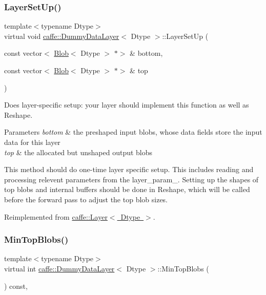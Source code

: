 \subsubsection{\texorpdfstring{Layer\+Set\+Up()}{LayerSetUp()}\hspace{0.1cm}{\footnotesize\ttfamily [2/2]}}
{\footnotesize\ttfamily template$<$typename Dtype$>$ \\
virtual void \mbox{\hyperlink{classcaffe_1_1_dummy_data_layer}{caffe\+::\+Dummy\+Data\+Layer}}$<$ Dtype $>$\+::Layer\+Set\+Up (\begin{DoxyParamCaption}\item[{const vector$<$ \mbox{\hyperlink{classcaffe_1_1_blob}{Blob}}$<$ Dtype $>$ $\ast$$>$ \&}]{bottom,  }\item[{const vector$<$ \mbox{\hyperlink{classcaffe_1_1_blob}{Blob}}$<$ Dtype $>$ $\ast$$>$ \&}]{top }\end{DoxyParamCaption})\hspace{0.3cm}{\ttfamily [virtual]}}



Does layer-\/specific setup\+: your layer should implement this function as well as Reshape. 


\begin{DoxyParams}{Parameters}
{\em bottom} & the preshaped input blobs, whose data fields store the input data for this layer \\
\hline
{\em top} & the allocated but unshaped output blobs\\
\hline
\end{DoxyParams}
This method should do one-\/time layer specific setup. This includes reading and processing relevent parameters from the {\ttfamily layer\+\_\+param\+\_\+}. Setting up the shapes of top blobs and internal buffers should be done in {\ttfamily Reshape}, which will be called before the forward pass to adjust the top blob sizes. 

Reimplemented from \mbox{\hyperlink{classcaffe_1_1_layer_a481323a3e0972c682787f2137468c29f}{caffe\+::\+Layer$<$ Dtype $>$}}.

\mbox{\label{classcaffe_1_1_dummy_data_layer_a2a63e36dd6b39287981d0bee466975aa}} 
\subsubsection{\texorpdfstring{Min\+Top\+Blobs()}{MinTopBlobs()}\hspace{0.1cm}{\footnotesize\ttfamily [1/2]}}
{\footnotesize\ttfamily template$<$typename Dtype$>$ \\
virtual int \mbox{\hyperlink{classcaffe_1_1_dummy_data_layer}{caffe\+::\+Dummy\+Data\+Layer}}$<$ Dtype $>$\+::Min\+Top\+Blobs (\begin{DoxyParamCaption}{ }\end{DoxyParamCaption}) const\hspace{0.3cm}{\ttfamily [inline]}, {\ttfamily [virtual]}}



